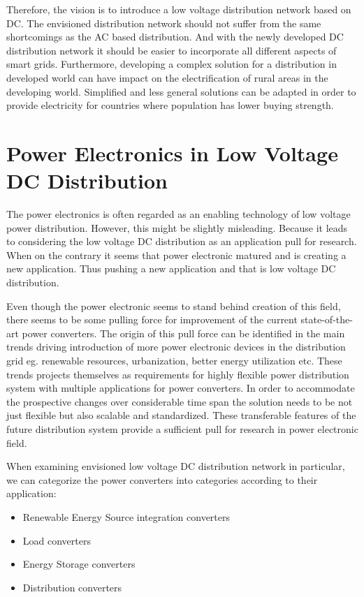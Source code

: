 \documentclass[]{scrreprt}
\begin{document}
Therefore, the vision is to introduce a low voltage distribution network based on DC. The envisioned distribution network should not suffer from the same shortcomings as the AC based distribution. And with the newly developed DC distribution network it should be easier to incorporate all different aspects of smart grids. Furthermore, developing a complex solution for a distribution in developed world can have impact on the electrification of rural areas in the developing world. Simplified and less general solutions can be adapted in order to provide electricity for countries where population has lower buying strength.

\section{Power Electronics in Low Voltage DC Distribution}

The power electronics is often regarded as an enabling technology of low voltage power distribution. However, this might be slightly misleading. Because it leads to considering the low voltage DC distribution as an application pull for research. When on the contrary it seems that power electronic matured and is creating a new application. Thus pushing a new application and that is low voltage DC distribution. 

Even though the power electronic seems to stand behind creation of this field, there seems to be some pulling force for improvement of the current state-of-the-art power converters. The origin of this pull force can be identified in the main trends driving introduction of more power electronic devices in the distribution grid eg. renewable resources, urbanization, better energy utilization etc. These trends projects themselves as requirements for highly flexible power distribution system with multiple applications for power converters. In order to accommodate the prospective changes over considerable time span the solution needs to be not just flexible but also scalable and standardized. These transferable features of the future distribution system provide a sufficient pull for research in power electronic field.

When examining envisioned low voltage DC distribution network in particular, we can categorize the power converters into categories according to their application:
\begin{itemize}
	\item Renewable Energy Source integration converters
	\item Load converters
	\item Energy Storage converters
	\item Distribution converters
\end{itemize}
\end{document}
